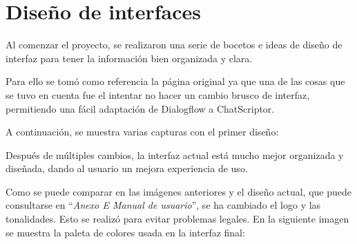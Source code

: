 \section{Diseño de interfaces}
Al comenzar el proyecto, se realizaron una serie de bocetos e ideas de diseño de interfaz para tener la información bien organizada y clara. 

Para ello se tomó como referencia la página original ya que una de las cosas que se tuvo en cuenta fue el intentar no hacer un cambio brusco de interfaz, permitiendo una fácil adaptación de Dialogflow a ChatScriptor.

A continuación, se muestra varias capturas con el primer diseño:

Después de múltiples cambios, la interfaz actual está mucho mejor organizada y diseñada, dando al usuario un mejora experiencia de uso.

Como se puede comparar en las imágenes anteriores y el diseño actual, que puede consultarse en ``\textit{Anexo E Manual de usuario}'', se ha cambiado el logo y las tonalidades. Esto se realizó para evitar problemas legales. En la siguiente imagen se muestra la paleta de colores usada en la interfaz final:


